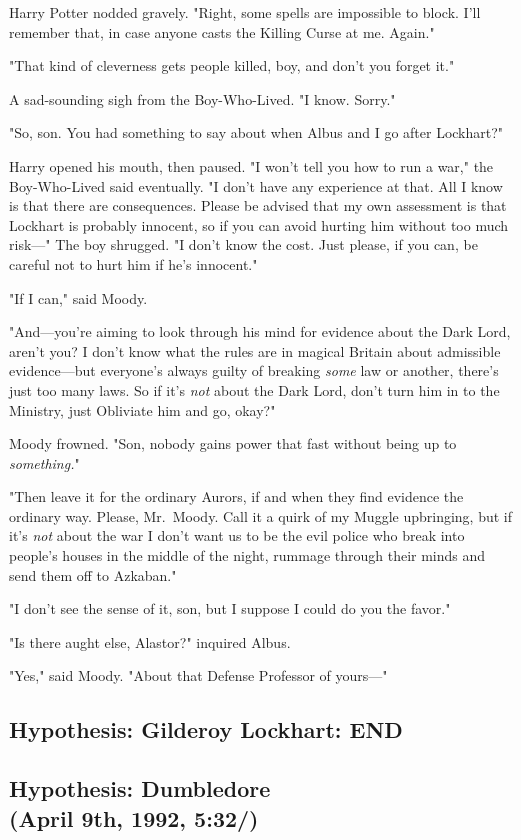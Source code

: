 Harry Potter nodded gravely. "Right, some spells are impossible to block. I'll
remember that, in case anyone casts the Killing Curse at me. Again."

"That kind of cleverness gets people killed, boy, and don't you forget it."

A sad-sounding sigh from the Boy-Who-Lived. "I know. Sorry."

"So, son. You had something to say about when Albus and I go after Lockhart?"

Harry opened his mouth, then paused. "I won't tell you how to run a war," the
Boy-Who-Lived said eventually. "I don't have any experience at that. All I know
is that there are consequences. Please be advised that my own assessment is
that Lockhart is probably innocent, so if you can avoid hurting him without too
much risk\mbox{---}" The boy shrugged. "I don't know the cost. Just please, if you
can, be careful not to hurt him if he's innocent."

"If I can," said Moody.

"And---you're aiming to look through his mind for evidence about the Dark Lord,
aren't you? I don't know what the rules are in magical Britain about admissible
evidence---but everyone's always guilty of breaking \emph{some} law or another,
there's just too many laws. So if it's \emph{not} about the Dark Lord, don't
turn him in to the Ministry, just Obliviate him and go, okay?"

Moody frowned. "Son, nobody gains power that fast without being up to
\emph{something.}"

"Then leave it for the ordinary Aurors, if and when they find evidence the
ordinary way. Please, Mr.~Moody. Call it a quirk of my Muggle upbringing, but
if it's \emph{not} about the war I don't want us to be the evil police who
break into people's houses in the middle of the night, rummage through their
minds and send them off to Azkaban."

"I don't see the sense of it, son, but I suppose I could do you the favor."

"Is there aught else, Alastor?" inquired Albus.

"Yes," said Moody. "About that Defense Professor of yours\mbox{---}"
\sbreak
\subsection{Hypothesis: Gilderoy Lockhart: END}
\sbreak
\subsection{Hypothesis: Dumbledore\\
(April 9th, 1992, 5:32\PM/)}

